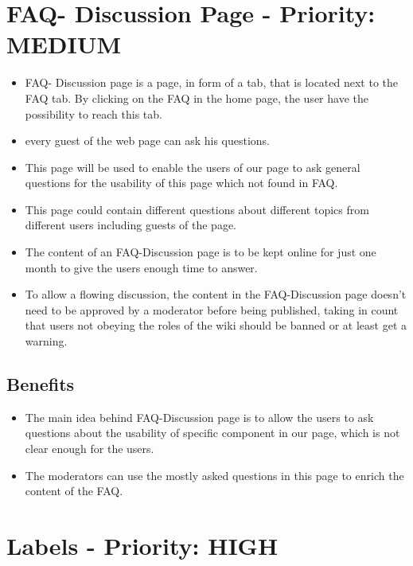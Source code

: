 \section{FAQ- Discussion Page - Priority: MEDIUM}
\begin{itemize}
\item FAQ- Discussion page is a page, in form of a tab, that is located next to the FAQ tab. By clicking on the FAQ in the home page, the user have the possibility to reach this tab.
\item every guest of the web page can ask his questions.
\item This page will be used to enable the users of our page to ask general questions for the usability of this page which not found in FAQ.
\item This page could contain different questions about different topics from different users including guests of the page.
\item The content of an FAQ-Discussion page is to be kept online for just one month to give the users enough time to answer.
\item To allow a flowing discussion, the content in the FAQ-Discussion page doesn’t need to be approved by a moderator before being published, taking in count that users not obeying the roles of the wiki should be banned or at least get a warning.
\end{itemize}

\subsection{Benefits}
\begin{itemize}
\item The main idea behind FAQ-Discussion page is to allow the users to ask questions about the usability of specific component in our page, which is not clear enough for the users.
\item The moderators can use the mostly asked questions in this page to enrich the content of the FAQ.
\end{itemize}




\section{Labels - Priority: HIGH}
 
